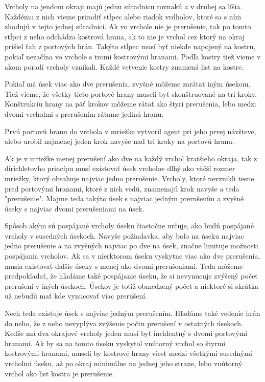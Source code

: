 Vrcholy na jendom okraji majú jednu súradnicu rovnakú a v druhej sa líšia.
Každému z nich vieme priradiť stĺpec alebo riadok vrdholov, ktoré sa s ním
zhodujú v tejto jednej súradnici. Ak vo vrchole nie je prerušenie, tak po
tomto stĺpci z neho odchádza kostrová hrana, ak to nie je vrchol cez ktorý na
okraj prišiel ťah z portových hrán. Takýto stĺpec musí byť niekde napojený
na kostru, pokiaľ nezačína vo vrchole s tromi kostrovými hranami. Podľa
kostry tiež vieme v akom poradí vrcholy vznikali. Každé vetvenie kostry
znamená list na kostre.

Pokiaľ má úsek viac ako dve prerušenia, zvyšné môžeme zarátať iným úsekom.
Tiež vieme, že všetky tieto portové hrany museli byť skonštruované na tri kroky.
Konštrukciu hrany na päť krokov môžeme rátať ako štyri prerušenia, lebo
medzi dvomi vrcholmi s prerušením rátame jedinú hranu.

Prvú portovú hranu do vrchola v mriežke vytvoril agent pri jeho prvej
návšteve, alebo urobil najmenej jeden krok navyše nad tri kroky na portovú
hranu.

Ak je v mriežke menej prerušení ako dve na každý vrchol kratšieho okraja,
tak z dirichletovho princípu musí existovať úsek vrcholov dlhý ako väčší
rozmer mriežky, ktorý obsahuje najviac jedno prerušenie.
Vrcholy, ktoré nevznikli tesne pred portovými hranami, ktoré z nich vedú,
znamenajú krok navyše a teda "prerušenie". Majme teda takýto úsek s najviac
jedným prerušením a zvyšné úseky s najviac dvomi prerušeniami na úsek.

Spôsob akým sú pospájané vrcholy úseku čiastočne určuje, ako budú pospájané
vrcholy v susedných úsekoch. Navyše požiadavka, aby bolo na úseku najviac
jedno prerušenie a na zvyšných najviac po dve na úsek, značne limituje
možnosti pospájania vrcholov.
Ak sa v nierktorom úseku vyskytne viac ako dve prerušenia, musia existovať
ďalšie úseky s menej ako dvomi prerušeniami. Teda môžeme predpokladať, že
hľadáme také pospájanie úseku, že si nevynucuje zvýšený počet prerušení v
iných úsekoch. Úsekov je totiž obmedzený počet a niektoré si skrátka už
nebudú mať kde vynucovať viac prerušení.

Nech teda existuje úsek s najviac jedným prerušením. Hľadáme také vedenie
hrán do neho, že z neho nevyplýva zvýšenie počtu prerušení v ostatných
úsekoch. Keďže má dva okrajové vrcholy jeden musí byť incidentný s dvomi
portovými hranami. Ak by sa na tomto úseku vyskytol vnútorný vrchol so
štyrmi kostrovými hranami, museli by kostrové hrany viesť medzi všetkými
susednými vrcholmi úseku, až po okraj minimálne na jednej jeho strane, lebo
vnútorný vrchol ako list kostra je prerušenie.

